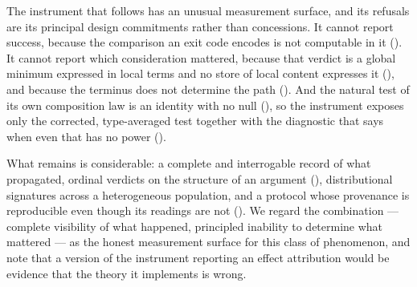 \documentclass[11pt,a4paper]{article}
\theoremstyle{clstyle}
\theoremstyle{definition}
\theoremstyle{remark}
\begin{document}
The instrument that follows has an unusual measurement surface, and its
refusals are its principal design commitments rather than concessions. It
cannot report success, because the comparison an exit code encodes is not
computable in it (). It cannot report which
consideration mattered, because that verdict is a global minimum expressed in
local terms and no store of local content expresses it
(), and because the terminus does not determine the
path (). And the natural test of its own composition law is
an identity with no null (), so the instrument exposes
only the corrected, type-averaged test together with the diagnostic that says
when even that has no power ().

What remains is considerable: a complete and interrogable record of what
propagated, ordinal verdicts on the structure of an argument
(), distributional signatures across a heterogeneous
population, and a protocol whose provenance is reproducible even though its
readings are not (). We regard the combination ---
complete visibility of what happened, principled inability to determine what
mattered --- as the honest measurement surface for this class of phenomenon,
and note that a version of the instrument reporting an effect attribution
would be evidence that the theory it implements is wrong.



\end{document}
